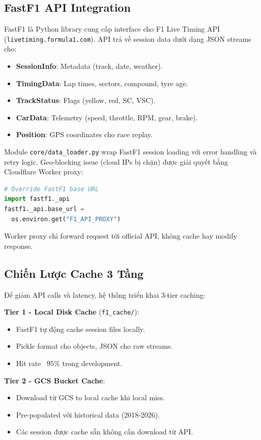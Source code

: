 \documentclass[conference,10pt]{IEEEtran}
\begin{document}
\subsection{FastF1 API Integration}

FastF1 là Python library cung cấp interface cho F1 Live Timing API (\texttt{livetiming.formula1.com}). API trả về session data dưới dạng JSON streams cho:
\begin{itemize}
    \item \textbf{SessionInfo}: Metadata (track, date, weather).
    \item \textbf{TimingData}: Lap times, sectors, compound, tyre age.
    \item \textbf{TrackStatus}: Flags (yellow, red, SC, VSC).
    \item \textbf{CarData}: Telemetry (speed, throttle, RPM, gear, brake).
    \item \textbf{Position}: GPS coordinates cho race replay.
\end{itemize}

Module \texttt{core/data\_loader.py} wrap FastF1 session loading với error handling và retry logic. Geo-blocking issue (cloud IPs bị chặn) được giải quyết bằng Cloudflare Worker proxy:

\begin{lstlisting}[language=Python]
# Override FastF1 base URL
import fastf1._api
fastf1._api.base_url =
  os.environ.get("F1_API_PROXY")
\end{lstlisting}

Worker proxy chỉ forward request tới official API, không cache hay modify response.

\subsection{Chiến Lược Cache 3 Tầng}

Để giảm API calls và latency, hệ thống triển khai 3-tier caching:

\textbf{Tier 1 - Local Disk Cache} (\texttt{f1\_cache/}):
\begin{itemize}
    \item FastF1 tự động cache session files locally.
    \item Pickle format cho objects, JSON cho raw streams.
    \item Hit rate ~95\% trong development.
\end{itemize}

\textbf{Tier 2 - GCS Bucket Cache}:
\begin{itemize}
    \item Download từ GCS to local cache khi local miss.
    \item Pre-populated với historical data (2018-2026).
    \item Các session được cache sẵn không cần download từ API.
\end{itemize}
\end{document}
